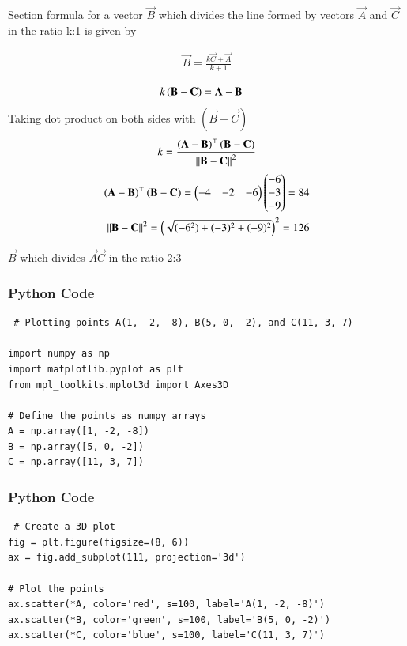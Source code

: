 \documentclass{beamer}
\begin{document}
 Section formula for a vector $\vec{B}$ which divides the line formed by vectors $\vec{A}$ and $\vec{C}$ in the ratio k:1 is given by

\begin{align}
    \vec{B}=\frac{k\vec{C}+\vec{A}}{k+1}\\
\end{align}
\begin{align}
			k\left(\mathbf{B}-\mathbf{C}\right)&= \mathbf{A}-\mathbf{B}
            \end{align}
Taking dot product on both sides with $(\vec{B}-\vec{C})$
\begin{align}
 k =\frac{\left(\mathbf{A}-\mathbf{B}\right)^{\top}\left(\mathbf{B}-\mathbf{C}\right)}{\left\lVert\mathbf{B}-\mathbf{C}\right\rVert^2}
\end{align}
\bigskip
\begin{align}
\left(\mathbf{A}-\mathbf{B}\right)^{\top}\left(\mathbf{B}-\mathbf{C}\right) = \begin{pmatrix}-4 & -2 &  -6 \end{pmatrix}\begin{pmatrix}-6\\-3\\-9\end{pmatrix} = 84\\
{\left\lVert\mathbf{B}-\mathbf{C}\right\rVert^2} = \left(\sqrt{(-6^2) + (-3)^2 + (-9)^2}\right)^2 = 126
\end{align}


 $\vec{B}$ which divides  $\vec{A}\vec{C}$ in the ratio 2:3







\begin{frame}[fragile]
    \frametitle{Python Code}
    \begin{lstlisting}
 # Plotting points A(1, -2, -8), B(5, 0, -2), and C(11, 3, 7)
 
import numpy as np
import matplotlib.pyplot as plt
from mpl_toolkits.mplot3d import Axes3D

# Define the points as numpy arrays
A = np.array([1, -2, -8])
B = np.array([5, 0, -2])
C = np.array([11, 3, 7])
\end{lstlisting}
\end{frame}

\begin{frame}[fragile]
    \frametitle{Python Code}

    \begin{lstlisting}
 # Create a 3D plot
fig = plt.figure(figsize=(8, 6))
ax = fig.add_subplot(111, projection='3d')

# Plot the points
ax.scatter(*A, color='red', s=100, label='A(1, -2, -8)')
ax.scatter(*B, color='green', s=100, label='B(5, 0, -2)')
ax.scatter(*C, color='blue', s=100, label='C(11, 3, 7)')



    \end{lstlisting}
\end{frame}
\end{document}
